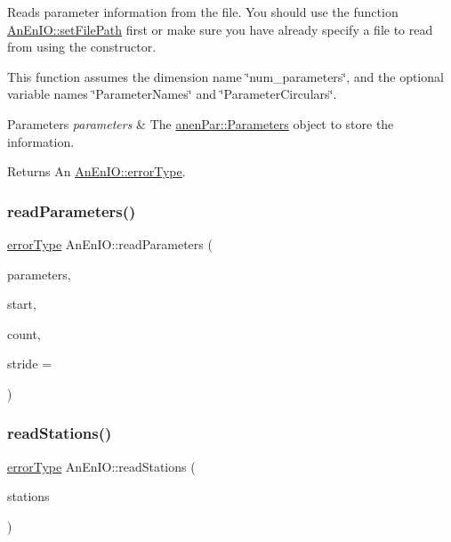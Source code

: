 Reads parameter information from the file. You should use the function \mbox{\hyperlink{class_an_en_i_o_a98066d375cc78694fda2af1ce37cc8d8}{An\+En\+I\+O\+::set\+File\+Path}} first or make sure you have already specify a file to read from using the constructor.

This function assumes the dimension name \char`\"{}num\+\_\+parameters\char`\"{}, and the optional variable names \char`\"{}\+Parameter\+Names\char`\"{} and \char`\"{}\+Parameter\+Circulars\char`\"{}.


\begin{DoxyParams}{Parameters}
{\em parameters} & The \mbox{\hyperlink{classanen_par_1_1_parameters}{anen\+Par\+::\+Parameters}} object to store the information. \\
\hline
\end{DoxyParams}
\begin{DoxyReturn}{Returns}
An \mbox{\hyperlink{class_an_en_i_o_aa56bc1ec6610b86db4349bce20f9ead0}{An\+En\+I\+O\+::error\+Type}}. 
\end{DoxyReturn}
\mbox{\label{class_an_en_i_o_a0ff7e8d615ed2127ab66b83ee78fc820}} 
\subsubsection{\texorpdfstring{read\+Parameters()}{readParameters()}\hspace{0.1cm}{\footnotesize\ttfamily [2/2]}}
{\footnotesize\ttfamily \mbox{\hyperlink{class_an_en_i_o_aa56bc1ec6610b86db4349bce20f9ead0}{error\+Type}} An\+En\+I\+O\+::read\+Parameters (\begin{DoxyParamCaption}\item[{\mbox{\hyperlink{classanen_par_1_1_parameters}{anen\+Par\+::\+Parameters}} \&}]{parameters,  }\item[{size\+\_\+t}]{start,  }\item[{size\+\_\+t}]{count,  }\item[{ptrdiff\+\_\+t}]{stride = {} }\end{DoxyParamCaption})}

\mbox{\label{class_an_en_i_o_aaec8b46a52f3d8ab904fd4229bd3b9e9}} 
\subsubsection{\texorpdfstring{read\+Stations()}{readStations()}\hspace{0.1cm}{\footnotesize\ttfamily [1/2]}}
{\footnotesize\ttfamily \mbox{\hyperlink{class_an_en_i_o_aa56bc1ec6610b86db4349bce20f9ead0}{error\+Type}} An\+En\+I\+O\+::read\+Stations (\begin{DoxyParamCaption}\item[{\mbox{\hyperlink{classanen_sta_1_1_stations}{anen\+Sta\+::\+Stations}} \&}]{stations }\end{DoxyParamCaption})}

